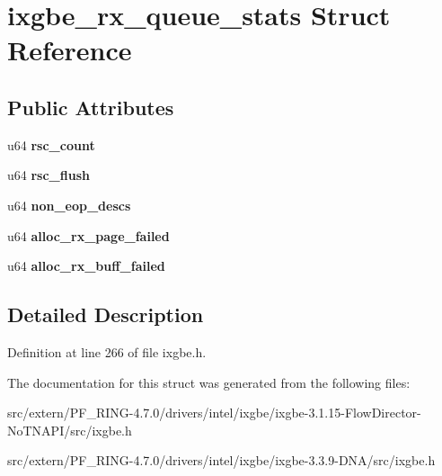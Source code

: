 \hypertarget{structixgbe__rx__queue__stats}{
\section{ixgbe\_\-rx\_\-queue\_\-stats Struct Reference}
\label{structixgbe__rx__queue__stats}
}
\subsection*{Public Attributes}
\begin{DoxyCompactItemize}
\item 
\hypertarget{structixgbe__rx__queue__stats_a8247c0d7e9299f5d3138d170b2dadbfc}{
u64 {\bfseries rsc\_\-count}}
\label{structixgbe__rx__queue__stats_a8247c0d7e9299f5d3138d170b2dadbfc}

\item 
\hypertarget{structixgbe__rx__queue__stats_a44b1a0826cff61031872bcecc0f3270f}{
u64 {\bfseries rsc\_\-flush}}
\label{structixgbe__rx__queue__stats_a44b1a0826cff61031872bcecc0f3270f}

\item 
\hypertarget{structixgbe__rx__queue__stats_aefb6511fec978ed06a8e408974b523a9}{
u64 {\bfseries non\_\-eop\_\-descs}}
\label{structixgbe__rx__queue__stats_aefb6511fec978ed06a8e408974b523a9}

\item 
\hypertarget{structixgbe__rx__queue__stats_a7db545cd5e8fedf56dac33e218c89a7c}{
u64 {\bfseries alloc\_\-rx\_\-page\_\-failed}}
\label{structixgbe__rx__queue__stats_a7db545cd5e8fedf56dac33e218c89a7c}

\item 
\hypertarget{structixgbe__rx__queue__stats_a3d02745533561ae85bb60952d3093dee}{
u64 {\bfseries alloc\_\-rx\_\-buff\_\-failed}}
\label{structixgbe__rx__queue__stats_a3d02745533561ae85bb60952d3093dee}

\end{DoxyCompactItemize}


\subsection{Detailed Description}


Definition at line 266 of file ixgbe.h.



The documentation for this struct was generated from the following files:\begin{DoxyCompactItemize}
\item 
src/extern/PF\_\-RING-\/4.7.0/drivers/intel/ixgbe/ixgbe-\/3.1.15-\/FlowDirector-\/NoTNAPI/src/ixgbe.h\item 
src/extern/PF\_\-RING-\/4.7.0/drivers/intel/ixgbe/ixgbe-\/3.3.9-\/DNA/src/ixgbe.h\end{DoxyCompactItemize}
